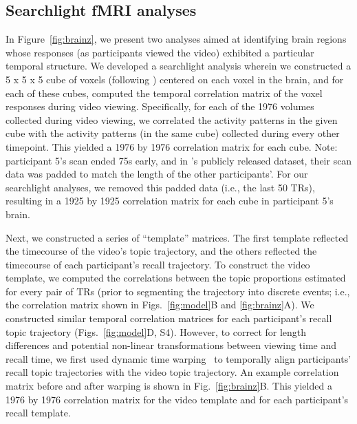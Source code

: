 \documentclass{article}
\newcommand{\corrmats}{S4}
\begin{document}
\subsection*{Searchlight fMRI analyses}
In Figure~\ref{fig:brainz}, we present two analyses aimed at identifying brain regions whose responses (as participants viewed the video) exhibited a particular temporal structure.  We developed a searchlight analysis wherein we constructed a 5 x 5 x 5 cube of voxels (following \citealp{ChenEtal17}) centered on each voxel in the brain, and for each of these cubes, computed the temporal correlation matrix of the voxel responses during video viewing.  Specifically, for each of the 1976 volumes collected during video viewing, we correlated the activity patterns in the given cube with the activity patterns (in the same cube) collected during every other timepoint.  This yielded a 1976 by 1976 correlation matrix for each cube.  Note: participant 5's scan ended 75s early, and in \citealp{ChenEtal17}'s publicly released dataset, their scan data was padded to match the length of the other participants'.  For our searchlight analyses, we removed this padded data (i.e., the last 50 TRs), resulting in a 1925 by 1925 correlation matrix for each cube in participant 5's brain.

Next, we constructed a series of ``template'' matrices.  The first template reflected the timecourse of the video's topic trajectory, and the others reflected the timecourse of each participant's recall trajectory.  To construct the video template, we computed the correlations between the topic proportions estimated for every pair of TRs (prior to segmenting the trajectory into discrete events; i.e., the correlation matrix shown in Figs.~\ref{fig:model}B and \ref{fig:brainz}A).  We constructed similar temporal correlation matrices for each participant's recall topic trajectory (Figs.~\ref{fig:model}D, \corrmats).  However, to correct for length differences and potential non-linear transformations between viewing time and recall time, we first used dynamic time warping~\citep{BernClif94} to temporally align participants' recall topic trajectories with the video topic trajectory.  An example correlation matrix before and after warping is shown in Fig.~\ref{fig:brainz}B.  This yielded a 1976 by 1976 correlation matrix for the video template and for each participant's recall template.
\end{document}
